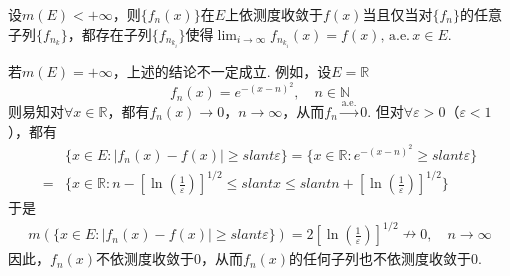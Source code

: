 \documentclass[../../main.tex]{subfiles}
\begin{document}
\begin{corollary}\label{corollary:Riesz定理推论}
设\(m(E) < +\infty\)，则$\{f_n(x)\}$在$E$上依测度收敛于$f(x)$当且仅当对\(\{f_n\}\)的任意子列\(\{f_{n_k}\}\)，都存在子列\(\{f_{n_{k_i}}\}\)使得$\lim_{i\to \infty}f_{n_{k_i}}(x)= f(x),\,\text{a.e.}\,x\in E.$
\end{corollary}
\begin{remark}
若\(m(E) = +\infty\)，上述的结论不一定成立. 例如，设\(E = \mathbb{R}\)
\[f_n(x) = e^{-(x - n)^2}, \quad n \in \mathbb{N}\]
则易知对\(\forall x \in \mathbb{R}\)，都有\(f_n(x) \to 0\)，\(n \to \infty\)，从而\(f_n \stackrel{\text{a.e.}}{\longrightarrow} 0\). 但对\(\forall \varepsilon > 0\)（\(\varepsilon < 1\)），都有
\begin{align*}
&\{x \in E : |f_n(x) - f(x)| \geqslant slant \varepsilon\} = \{x \in \mathbb{R} : e^{-(x - n)^2} \geqslant slant \varepsilon\} \\
=& \{x \in \mathbb{R} : n - \left[\ln \left(\frac{1}{\varepsilon}\right)\right]^{1/2} \leqslant slant x \leqslant slant n + \left[\ln \left(\frac{1}{\varepsilon}\right)\right]^{1/2}\}
\end{align*}
于是
\begin{align*}
m(\{x \in E : |f_n(x) - f(x)| \geqslant slant \varepsilon\}) = 2\left[\ln \left(\frac{1}{\varepsilon}\right)\right]^{1/2} \nrightarrow 0, \quad n \to \infty
\end{align*}
因此，\(f_n(x)\)不依测度收敛于\(0\)，从而\(f_n(x)\)的任何子列也不依测度收敛于\(0\). 
\end{remark}
\end{document}

